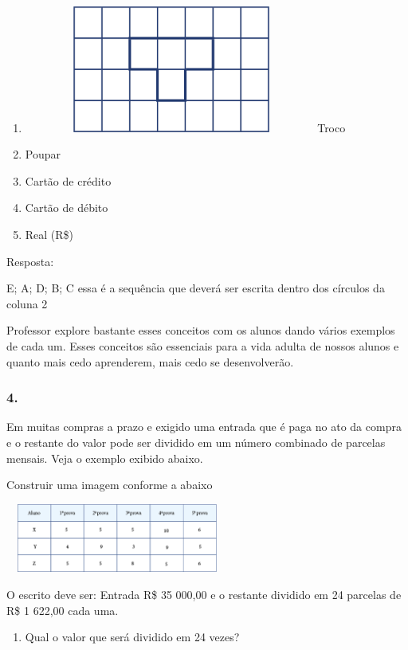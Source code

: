 \begin{enumerate}
\def\labelenumi{\alph{enumi})}
\item
  \includegraphics[width=3.81667in,height=1.64167in]{media/image81.png}Troco
\item
  Poupar
\item
  Cartão de crédito
\item
  Cartão de débito
\item
  Real (R\$)
\end{enumerate}

Resposta:

E; A; D; B; C essa é a sequência que deverá ser escrita dentro dos
círculos da coluna 2

Professor explore bastante esses conceitos com os alunos dando vários
exemplos de cada um. Esses conceitos são essenciais para a vida adulta
de nossos alunos e quanto mais cedo aprenderem, mais cedo se
desenvolverão.

\subsubsection{4.}\label{section-68}

Em muitas compras a prazo e exigido uma entrada que é paga no ato da
compra e o restante do valor pode ser dividido em um número combinado de
parcelas mensais. Veja o exemplo exibido abaixo.

Construir uma imagem conforme a abaixo

\includegraphics[width=2.90025in,height=0.89174in]{media/image82.png}

O escrito deve ser: Entrada R\$ 35 000,00 e o restante dividido em 24
parcelas de R\$ 1 622,00 cada uma.

\begin{enumerate}
\def\labelenumi{\alph{enumi})}
\item
  Qual o valor que será dividido em 24 vezes?
\end{enumerate}

